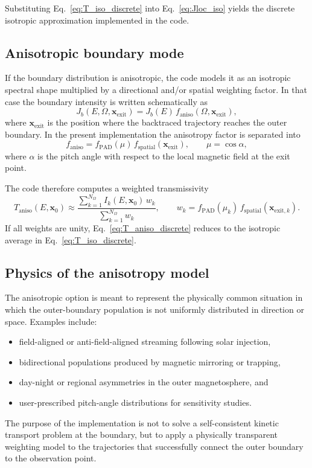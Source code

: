 \documentclass[11pt]{article}
\begin{document}
Substituting Eq.~\eqref{eq:T_iso_discrete} into Eq.~\eqref{eq:Jloc_iso} yields
the discrete isotropic approximation implemented in the code.

\subsection{Anisotropic boundary mode}
If the boundary distribution is anisotropic, the code models it as an isotropic
spectral shape multiplied by a directional and/or spatial weighting factor. In
that case the boundary intensity is written schematically as
\begin{equation}
  J_b(E,\Omega,\bm{x}_{\mathrm{exit}})
  = J_b(E)\,f_{\mathrm{aniso}}(\Omega,\bm{x}_{\mathrm{exit}}),
\end{equation}
where $\bm{x}_{\mathrm{exit}}$ is the position where the backtraced trajectory
reaches the outer boundary. In the present implementation the anisotropy factor
is separated into
\begin{equation}
  f_{\mathrm{aniso}} = f_{\mathrm{PAD}}(\mu)\,f_{\mathrm{spatial}}(\bm{x}_{\mathrm{exit}}),
  \qquad \mu = \cos\alpha,
  \label{eq:aniso_factorization}
\end{equation}
where $\alpha$ is the pitch angle with respect to the local magnetic field at the
exit point.

The code therefore computes a weighted transmissivity
\begin{equation}
  T_{\mathrm{aniso}}(E,\bm{x}_0)
  \approx
  \frac{\sum_{k=1}^{N_\Omega} I_k(E,\bm{x}_0)\,w_k}
       {\sum_{k=1}^{N_\Omega} w_k},
  \qquad w_k = f_{\mathrm{PAD}}(\mu_k)\,f_{\mathrm{spatial}}(\bm{x}_{\mathrm{exit},k}).
  \label{eq:T_aniso_discrete}
\end{equation}
If all weights are unity, Eq.~\eqref{eq:T_aniso_discrete} reduces to the
isotropic average in Eq.~\eqref{eq:T_iso_discrete}.

\subsection{Physics of the anisotropy model}
The anisotropic option is meant to represent the physically common situation in
which the outer-boundary population is not uniformly distributed in direction or
space. Examples include:
\begin{itemize}
  \item field-aligned or anti-field-aligned streaming following solar injection,
  \item bidirectional populations produced by magnetic mirroring or trapping,
  \item day-night or regional asymmetries in the outer magnetosphere, and
  \item user-prescribed pitch-angle distributions for sensitivity studies.
\end{itemize}
The purpose of the implementation is not to solve a self-consistent kinetic
transport problem at the boundary, but to apply a physically transparent weighting
model to the trajectories that successfully connect the outer boundary to the
observation point.
\end{document}
